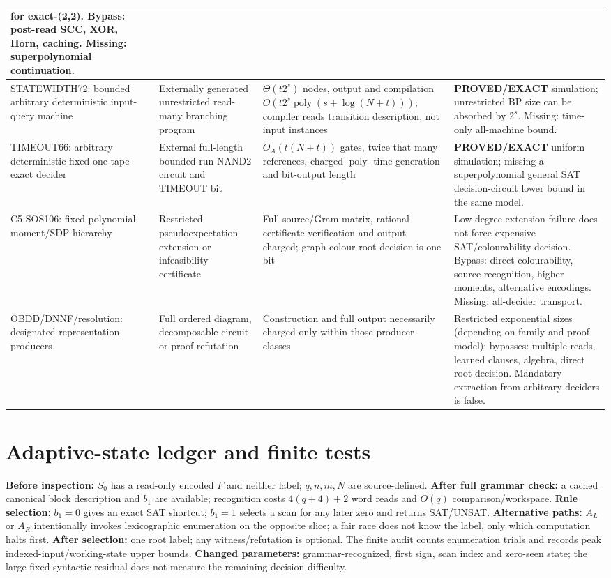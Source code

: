\documentclass[11pt]{article}
\begin{document}
\begin{longtable}{p{.155\linewidth}p{.175\linewidth}p{.255\linewidth}p{.29\linewidth}}
for exact-(2,2). Bypass: post-read SCC, XOR, Horn, caching.
Missing: superpolynomial continuation.\\
\midrule
STATEWIDTH72: bounded arbitrary deterministic input-query machine &
Externally generated unrestricted read-many branching program &
$\Theta(t2^s)$ nodes, output and compilation
$O(t2^s\operatorname{poly}(s+\log(N+t)))$; compiler reads transition
description, not input instances &
\textbf{PROVED/EXACT} simulation; unrestricted BP size can be
absorbed by $2^s$. Missing: time-only all-machine bound.\\
\midrule
TIMEOUT66: arbitrary deterministic fixed one-tape exact decider &
External full-length bounded-run NAND2 circuit and TIMEOUT bit &
$O_A(t(N+t))$ gates, twice that many references, charged
$\operatorname{poly}$-time generation and bit-output length &
\textbf{PROVED/EXACT} uniform simulation; missing a superpolynomial
general SAT decision-circuit lower bound in the same model.\\
\midrule
C5-SOS106: fixed polynomial moment/SDP hierarchy &
Restricted pseudoexpectation extension or infeasibility certificate &
Full source/Gram matrix, rational certificate verification and
output charged; graph-colour root decision is one bit &
Low-degree extension failure does not force expensive SAT/colourability
decision. Bypass: direct colourability, source recognition, higher
moments, alternative encodings. Missing: all-decider transport.\\
\midrule
OBDD/DNNF/resolution: designated representation producers &
Full ordered diagram, decomposable circuit or proof refutation &
Construction and full output necessarily charged only within
those producer classes &
Restricted exponential sizes (depending on family and proof model);
bypasses: multiple reads, learned clauses, algebra, direct root
decision. Mandatory extraction from arbitrary deciders is false.\\
\bottomrule
\end{longtable}
\normalsize

\section{Adaptive-state ledger and finite tests}
\noindent\textbf{Before inspection:} $S_0$ has a read-only encoded
$F$ and neither label; $q,n,m,N$ are source-defined.
\textbf{After full grammar check:} a cached canonical block description
and $b_1$ are available; recognition costs $4(q+4)+2$ word
reads and $O(q)$ comparison/workspace.
\textbf{Rule selection:} $b_1=0$ gives an exact SAT shortcut;
$b_1=1$ selects a scan for any later zero and returns SAT/UNSAT.
\textbf{Alternative paths:} $A_L$ or $A_R$ intentionally invokes
lexicographic enumeration on the opposite slice; a fair race
does not know the label, only which computation halts first.
\textbf{After selection:} one root label; any witness/refutation
is optional. The finite audit counts enumeration trials and records
peak indexed-input/working-state upper bounds.
\textbf{Changed parameters:} grammar-recognized, first sign, scan
index and zero-seen state; the large fixed syntactic residual
does not measure the remaining decision difficulty.
\end{document}
